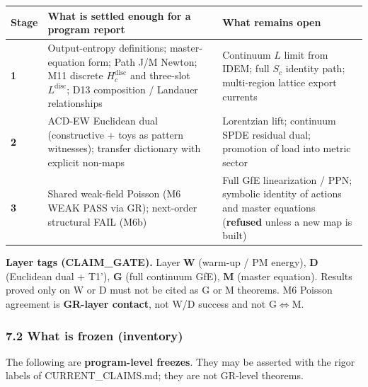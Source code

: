 \documentclass[
  11pt,
]{article}
\newcounter{none} %
\begin{document}
{\def\LTcaptype{none} %
\begin{longtable}[]{@{}
  >{\raggedright\arraybackslash}p{}
  >{\raggedright\arraybackslash}p{}
  >{\raggedright\arraybackslash}p{}@{}}
\toprule\noalign{}
\begin{minipage}[b]{\linewidth}\raggedright
Stage
\end{minipage} & \begin{minipage}[b]{\linewidth}\raggedright
What is settled enough for a program report
\end{minipage} & \begin{minipage}[b]{\linewidth}\raggedright
What remains open
\end{minipage} \\
\midrule\noalign{}
\endhead
\bottomrule\noalign{}
\endlastfoot
\textbf{1} & Output-entropy definitions; master-equation form; Path J/M
Newton; M11 discrete \(H_c^{\mathrm{disc}}\) and three-slot
\(L^{\mathrm{disc}}\); D13 composition / Landauer relationships &
Continuum \(L\) limit from IDEM; full \(S_c\) identity path;
multi-region lattice export currents \\
\textbf{2} & ACD-EW Euclidean dual (constructive + toys as pattern
witnesses); transfer dictionary with explicit non-maps & Lorentzian
lift; continuum SPDE residual dual; promotion of load into metric
sector \\
\textbf{3} & Shared weak-field Poisson (M6 WEAK PASS via GR); next-order
structural FAIL (M6b) & Full GfE linearization / PPN; symbolic identity
of actions and master equations (\textbf{refused} unless a new map is
built) \\
\end{longtable}
}

\textbf{Layer tags (CLAIM\_GATE).} Layer \textbf{W} (warm-up / PM
energy), \textbf{D} (Euclidean dual + T1'), \textbf{G} (full continuum
GfE), \textbf{M} (master equation). Results proved only on W or D must
not be cited as G or M theorems. M6 Poisson agreement is
\textbf{GR-layer contact}, not W/D success and not G$\Leftrightarrow$M.

\subsubsection{7.2 What is frozen
(inventory)}\label{what-is-frozen-inventory}

The following are \textbf{program-level freezes}. They may be asserted
with the rigor labels of CURRENT\_CLAIMS.md; they are not GR-level
theorems.
\end{document}
